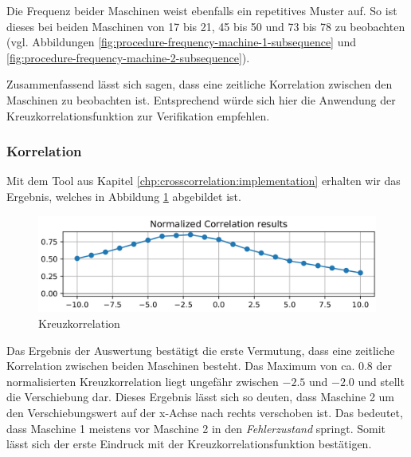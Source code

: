 Die Frequenz beider Maschinen weist ebenfalls ein repetitives  Muster auf. So ist dieses bei beiden Maschinen von 17 bis 21, 45 bis 50 und 73 bis 78 zu beobachten (vgl. Abbildungen \ref{fig:procedure-frequency-machine-1-subsequence} und \ref{fig:procedure-frequency-machine-2-subsequence}).

Zusammenfassend lässt sich sagen, dass eine zeitliche Korrelation zwischen den Maschinen zu beobachten ist. Entsprechend würde sich hier die Anwendung der Kreuzkorrelationsfunktion zur Verifikation empfehlen.



\subsubsection{Korrelation}

Mit dem Tool aus Kapitel \ref{chp:crosscorrelation:implementation} erhalten wir das Ergebnis, welches in Abbildung \ref{fig:procedure-crosscorrelation-subsequence} abgebildet ist.

\begin{figure}[H]
	\centering
	\includegraphics[scale=0.32]{images/procedure/crosscorrelation_machine_1_machine_2}
	\caption{Kreuzkorrelation}
	\label{fig:procedure-crosscorrelation-subsequence}
\end{figure}

Das Ergebnis der Auswertung bestätigt die erste Vermutung, dass eine zeitliche Korrelation zwischen beiden Maschinen besteht. Das Maximum von ca. $0.8$ der normalisierten Kreuzkorrelation liegt ungefähr zwischen $-2.5$ und $-2.0$ und stellt die Verschiebung dar. Dieses Ergebnis lässt sich so deuten, dass Maschine 2 um den Verschiebungswert auf der x-Achse nach rechts verschoben ist. Das bedeutet, dass Maschine 1 meistens vor Maschine 2 in den \textit{Fehlerzustand} springt. Somit lässt sich der erste Eindruck mit der Kreuzkorrelationsfunktion bestätigen.